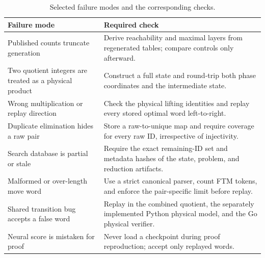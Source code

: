 \begin{table}[!ht]
\centering
\caption{Selected failure modes and the corresponding checks.}
\label{tab:threat-checks}
\small
\renewcommand{\arraystretch}{1.12}
\begin{tabularx}{\textwidth}{@{}
  >{\raggedright\arraybackslash}p{}
  >{\raggedright\arraybackslash}X@{}}
\toprule
Failure mode & Required check \\
\midrule
Published counts truncate generation & Derive reachability and maximal layers
from regenerated tables; compare controls only afterward. \\
Two quotient integers are treated as a physical product & Construct a full
state and round-trip both phase coordinates and the intermediate state. \\
Wrong multiplication or replay direction & Check the physical lifting
identities and replay every stored optimal word left-to-right. \\
Duplicate elimination hides a raw pair & Store a raw-to-unique map and require
coverage for every raw ID, irrespective of injectivity. \\
Search database is partial or stale & Require the exact remaining-ID set and
metadata hashes of the state, problem, and reduction artifacts. \\
Malformed or over-length move word & Use a strict canonical parser, count FTM
tokens, and enforce the pair-specific limit before replay. \\
Shared transition bug accepts a false word & Replay in the combined quotient,
the separately implemented Python physical model, and the Go physical verifier. \\
Neural score is mistaken for proof & Never load a checkpoint during proof
reproduction; accept only replayed words. \\
\bottomrule
\end{tabularx}
\end{table}
